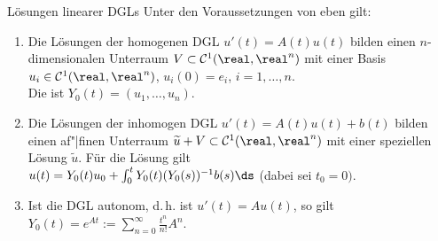 \begin{Satz}{Lösungen linearer DGLs}
    Unter den Voraussetzungen von eben gilt:
    \begin{enumerate}
        \item
        Die Lösungen der homogenen DGL $u'(t) = A(t) u(t)$
        bilden einen $n$-dimensionalen Unterraum
        $V \subset \C^1(\real, \real^n)$ mit einer Basis
        $u_i \in \C^1(\real, \real^n)$, $u_i(0) = e_i$, $i = 1, \dotsc, n$.\\
        Die  ist
        $Y_0(t) = (u_1, \dotsc, u_n)$.
        
        \item
        Die Lösungen der inhomogen DGL $u'(t) = A(t) u(t) + b(t)$
        bilden einen af"|finen Unterraum
        $\widetilde{u} + V \subset \C^1(\real, \real^n)$
        mit einer speziellen Lösung $\widetilde{u}$.
        Für die Lösung gilt\\
        $u(t) = Y_0(t) u_0 + \int_0^t Y_0(t) (Y_0(s))^{-1} b(s) \ds$
        (dabei sei $t_0 = 0)$.
        
        \item
        Ist die DGL autonom, d.\,h. ist $u'(t) = A u(t)$, so gilt
        $Y_0(t) = e^{At} := \sum_{n=0}^\infty \frac{t^n}{n!} A^n$.
    \end{enumerate}
\end{Satz}

